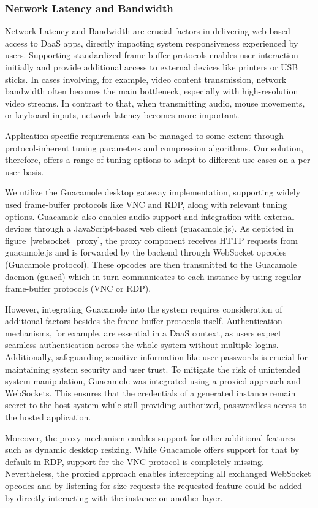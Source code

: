 \documentclass[runningheads]{llncs}
\begin{document}
\subsubsection{Network Latency and Bandwidth}
Network Latency and Bandwidth are crucial factors
in delivering web-based access to DaaS apps,
directly impacting system responsiveness experienced by users.
Supporting standardized frame-buffer protocols enables user interaction initially
and provide additional access to external devices like printers or USB sticks.
In cases involving, for example, video content transmission,
network bandwidth often becomes the main bottleneck,
especially with high-resolution video streams.
In contrast to that, when transmitting audio, mouse movements,
or keyboard inputs, network latency becomes more important.

Application-specific requirements can be managed to some extent
through protocol-inherent tuning parameters and compression algorithms.
Our solution, therefore, offers a range of tuning options
to adapt to different use cases on a per-user basis.

We utilize the Guacamole desktop gateway implementation,
supporting widely used frame-buffer protocols like VNC and RDP,
along with relevant tuning options.
Guacamole also enables audio support and integration with external devices
through a JavaScript-based web client (guacamole.js).
As depicted in figure~\ref{websocket_proxy},
the proxy component receives HTTP requests from guacamole.js
and is forwarded by the backend through WebSocket opcodes (Guacamole protocol).
These opcodes are then transmitted to the Guacamole daemon (guacd)
which in turn communicates to each instance
by using regular frame-buffer protocols (VNC or RDP).

However, integrating Guacamole into the system
requires consideration of additional factors besides the frame-buffer protocols itself.
Authentication mechanisms, for example, are essential in a DaaS context,
as users expect seamless authentication across the whole system
without multiple logins.
Additionally, safeguarding sensitive information like user passwords is crucial
for maintaining system security and user trust.
To mitigate the risk of unintended system manipulation, Guacamole was integrated
using a proxied approach and WebSockets.
This ensures that the credentials of a generated instance remain secret to the host system
while still providing authorized, passwordless access to the hosted application.

Moreover, the proxy mechanism enables support for other additional features
such as dynamic desktop resizing.
While Guacamole offers support for that by default in RDP, support for the VNC protocol is completely missing.
Nevertheless, the proxied approach enables intercepting all exchanged WebSocket opcodes
and by listening for size requests
the requested feature could be added
by directly interacting with the instance on another layer.
\end{document}
